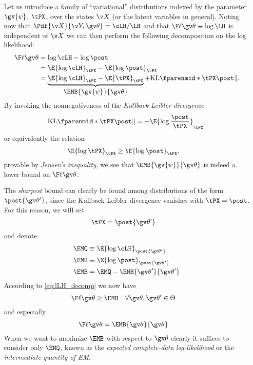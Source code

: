 Let us introduce a family of ``variational'' distributions 
indexed by the parameter $\gv{\psi}$, $\tPX$, over the states $\X$ (or the latent variables in general).
Noting now that $\Pdf{\X}{\Y,\Th}=\cLH/\LH$ and that $\lLH\equiv\log\LH$ is independent of $\X$ we can then perform the
following decomposition on the log likelihood:
\begin{align}
	\lLH &= \log\cLH - \log\post \nonumber\\
	&= \E{\log\cLH}_{\tPX} - \E{\log\post}_{\tPX} \nonumber\\ 
	&= \underbrace{\E{\log\cLH}_{\tPX} - \E{\tPX}_{\tPX}}_{\displaystyle \EMB{\gv{\psi}}{\Th}}+\KL{\tPX}{\post}. 
	\label{eq:lLH_decomp}
\end{align}
By invoking the nonnegativeness of
the \emph{Kullback-Leibler divergence}
\begin{align}
		\KL{\tPX}{\post} = -\E{\log{\frac{\post}{\tPX}}}_{\tPX},  
\end{align}
or equivalently the relation
\begin{align}
	\E{\log\tPX}_{\tPX} &\geq \E{\log\post}_{\tPX},	
\end{align}
provable by \emph{Jensen's inequality}, 
we see that $\EMB{\gv{\psi}}{\Th}$ is indeed a lower bound on $\lLH$. 

The \emph{sharpest} bound can clearly be found among
distributions of the form $\post{\Th'}$, since the Kullback-Leibler divergence vanishes with $\tPX=\post$.
For this reason, we will set
\begin{align}
	\tPX &= \post{\Th'}
\end{align} 
and denote
\begin{align}
	\EMQ &\equiv \E{\log\cLH}_{\post{\Th'}} \label{eq:EM_Q}\\
	\EMH &\equiv \E{\log\post}_{\post{\Th'}} \label{eq:EM_H}\\
	\EMB &= \EMQ - \EMH{\Th'}{\Th'} \label{eq:EM_B}
\end{align}
According to \eqref{eq:lLH_decomp} we now have
\begin{align}
	\lLH & \geq \EMB \quad \forall \Th,\Th' \in \Theta
	\label{eq:EM_LB}
\end{align}
and especially
\begin{align}
	\lLH & = \EMB{\Th}{\Th}
	\label{eq:EM_sharp_bound}
\end{align}
When we want to maximize $\EMB$ with respect to $\Th$
clearly it suffices to consider
only $\EMQ$, known as the \emph{expected complete-data log-likelihood}
or the \emph{intermediate quantity of EM}.

